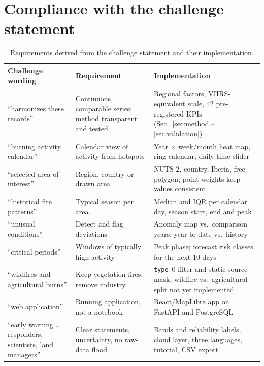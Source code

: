 \documentclass[11pt,a4paper]{article}
\begin{document}
\section{Compliance with the challenge statement}\label{sec:compliance}

\begin{table}[ht]
\centering\small
\caption{Requirements derived from the challenge statement and their implementation.}
\label{tab:compliance}
\begin{tabularx}{\linewidth}{@{}p{3.6cm}LL@{}}
\toprule
Challenge wording & Requirement & Implementation \\
\midrule
``harmonizes these records'' & Continuous, comparable series; method transparent and tested &
  Regional factors, VIIRS-equivalent scale, 42 pre-registered KPIs (Sec.~\ref{sec:method}--\ref{sec:validation}) \\
``burning activity calendar'' & Calendar view of activity from hotspots &
  Year $\times$ week/month heat map, ring calendar, daily time slider \\
``selected area of interest'' & Region, country or drawn area &
  NUTS-2, country, Iberia, free polygon; point weights keep values consistent \\
``historical fire patterns'' & Typical season per area &
  Median and IQR per calendar day, season start, end and peak \\
``unusual conditions'' & Detect and flag deviations &
  Anomaly map vs.\ comparison years; year-to-date vs.\ history \\
``critical periods'' & Windows of typically high activity &
  Peak phase; forecast risk classes for the next 10 days \\
``wildfires and agricultural burns'' & Keep vegetation fires, remove industry &
  \texttt{type}~0 filter and static-source mask; wildfire vs.\ agricultural split not yet implemented \\
``web application'' & Running application, not a notebook &
  React/MapLibre app on FastAPI and PostgreSQL \\
``early warning \dots{} responders, scientists, land managers'' & Clear statements, uncertainty, no raw-data flood &
  Bands and reliability labels, cloud layer, three languages, tutorial, CSV export \\
\bottomrule
\end{tabularx}
\end{table}
\end{document}
